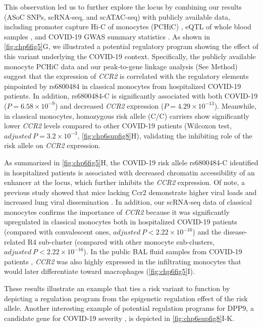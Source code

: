 \documentclass{book}
\begin{document}
\begin{refsection}
This observation led us to further explore the locus by combining our results (ASoC SNPs, scRNA-seq, and scATAC-seq) with publicly available data, including promoter capture Hi-C of monocytes (PCHiC) \cite{Javierre2016Lineage}, eQTL of whole blood samples \cite{Võsa2021Large}, and COVID-19 GWAS summary statistics \cite{Niemi2021Mapping}.
As shown in \ref{fig:chp6fig5}G, we illustrated a potential regulatory program showing the effect of this variant underlying the COVID-19 context.
Specifically, the publicly available monocyte PCHiC data and our peak-to-gene linkage analysis (See Method) suggest that the expression of \textit{CCR2} is correlated with the regulatory elements pinpointed by rs6800484 in classical monocytes from hospitalized COVID-19 patients.
In addition, rs6800484-C is significantly associated with both COVID-19 ($P = 6.58 \times 10^{-9}$) and decreased \textit{CCR2} expression ($P = 4.29 \times 10^{-13}$).
Meanwhile, in classical monocytes, homozygous risk allele (C/C) carriers show significantly lower \textit{CCR2} levels compared to other COVID-19 patients (Wilcoxon test, $adjusted~P = 3.2 \times 10^{-3}$, \ref{fig:chp6supfig8}H), validating the inhibiting role of the risk allele on \textit{CCR2} expression.

As summarized in \ref{fig:chp6fig5}H, the COVID-19 risk allele rs6800484-C identified in hospitalized patients is associated with decreased chromatin accessibility of an enhancer at the locus, which further inhibits the \textit{CCR2} expression.
Of note, a previous study showed that mice lacking Ccr2 demonstrate higher viral loads and increased lung viral dissemination \cite{Vanderheiden2021CCR2}.
In addition, our scRNA-seq data of classical monocytes confirms the importance of \textit{CCR2} because it was significantly upregulated in classical monocytes both in hospitalized COVID-19 patients (compared with convalescent ones, $adjusted~P < 2.22 \times 10^{-16}$) and the disease-related R4 sub-cluster (compared with other monocyte sub-clusters, $adjusted~P < 2.22 \times 10^{-16}$).
In the public BAL fluid samples from COVID-19 patients \cite{Wendisch2021SARS}, \textit{CCR2} was also highly expressed in the infiltrating monocytes that would later differentiate toward macrophages (\ref{fig:chp6fig5}I).

These results illustrate an example that ties a risk variant to function by depicting a regulation program from the epigenetic regulation effect of the risk allele.
Another interesting example of potential regulation programs for DPP9, a candidate gene for COVID-19 severity \cite{Pairo2020Genetic}, is depicted in \ref{fig:chp6supfig8}I-K.


\end{refsection}
\end{document}
